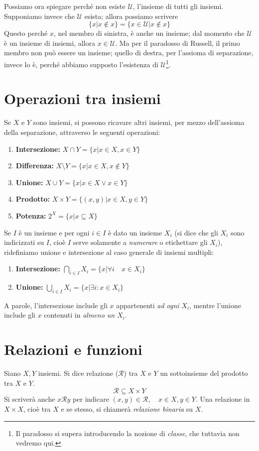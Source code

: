 Possiamo ora spiegare perché non esiste $\mathcal{U}$, l'insieme di tutti
gli insiemi. Supponiamo invece che $\mathcal{U}$ esista; allora possiamo
scrivere
\[ \{x|x\not\in x\} = \{x\in\mathcal{U}|x\not\in x\} \]
Questo perché $x$, nel membro di sinistra, è anche un insieme; dal momento
che $\mathcal{U}$ è un insieme di insiemi, allora $x\in\mathcal{U}$.
Ma per il paradosso di Russell, il primo membro non può essere un insieme;
quello di destra, per l'assioma di separazione, invece lo è, perché abbiamo
supposto l'esistenza di $\mathcal{U}$\footnote{Il paradosso si supera
introducendo la nozione di \textit{classe}, che tuttavia non vedremo qui.}.

\section{Operazioni tra insiemi}
Se $X$ e $Y$ sono insiemi, si possono ricavare altri insiemi, per mezzo
dell'assioma della separazione, attraverso le seguenti operazioni:
\begin{enumerate}
\item \textbf{Intersezione:} $X\cap Y=\{x|x\in X, x\in Y\}$
\item \textbf{Differenza:} $X\setminus Y=\{x|x\in X,x\not\in Y\}$
\item \textbf{Unione:} $X\cup Y=\{x|x\in X \vee x\in Y\}$
\item \textbf{Prodotto:} $X\times Y=\{(x,y)|x\in X, y\in Y\}$
\item \textbf{Potenza:} $2^X=\{x|x\subseteq X\}$
\end{enumerate}
Se $I$ è un insieme e per ogni $i\in I$ è dato un insieme $X_i$
(si dice che gli $X_i$ sono indicizzati su $I$, cioè $I$ serve
solamente a \emph{numerare} o etichettare gli $X_i$), ridefiniamo
unione e intersezione al caso generale di insiemi multipli:
\begin{enumerate}
\item \textbf{Intersezione:} $\bigcap_{i\in I}X_i=\{x|\forall i \quad x\in X_i\}$
\item \textbf{Unione:} $\bigcup_{i\in I}X_i=\{x|\exists i:x\in X_i\}$
\end{enumerate}
A parole, l'intersezione include gli $x$ appartenenti \textit{ad ogni}
$X_i$, mentre l'unione include gli $x$ contenuti in \textit{almeno un}
$X_i$.


\section{Relazioni e funzioni}
\begin{tcolorbox}[colback=yellow!30, colframe=yellow!30!black, title={Relazione}]
Siano $X,Y$ insiemi. Si dice relazione ($\mathcal{R}$) tra $X$ e $Y$ un sottoinsieme
del prodotto tra $X$ e $Y$.
\[\mathcal{R}\subseteq X\times Y\]
Si scriverà anche $x\mathcal{R}y$ per indicare $(x,y)\in\mathcal{R},
\quad x\in X,y\in Y$. Una relazione in $X\times X$, cioè tra $X$ e se stesso,
si chiamerà \textit{relazione binaria} su $X$.
\end{tcolorbox}


